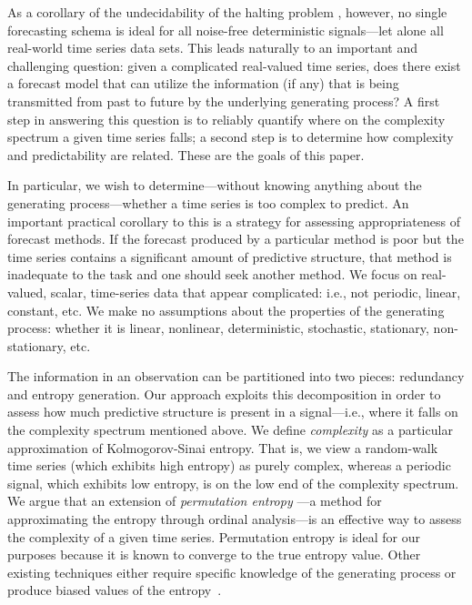 As a corollary of the undecidability of the halting problem
\cite{halting-problem}, however, no single forecasting schema is ideal
for all noise-free deterministic signals\cite{weigend-book}---let
alone all real-world time series data sets.  This leads naturally to
an important and challenging question: given a complicated real-valued
time series, does there exist a forecast model that can utilize the
information (if any) that is being transmitted from past to future by
the underlying generating process?  A first step in answering this
question is to reliably quantify where on the complexity spectrum a
given time series falls; a second step is to determine how complexity
and predictability are related.  These are the goals of this paper.

In particular, we wish to determine---without knowing anything about
the generating process---whether a time series is too complex to
predict.  An important practical corollary to this is a strategy for
assessing appropriateness of forecast methods.  If the forecast
produced by a particular method is poor but the time series contains a
significant amount of predictive structure, that method is inadequate
to the task and one should seek another method.  We focus on
real-valued, scalar, time-series data that appear complicated: i.e.,
not periodic, linear, constant, etc.  We make no assumptions about the
properties of the generating process: whether it is linear, nonlinear,
deterministic, stochastic, stationary, non-stationary, etc.  

The information in an observation can be partitioned into two pieces:
redundancy and entropy generation\cite{crutchfield2003}.  Our approach
exploits this decomposition in order to assess how much predictive
structure is present in a signal---i.e., where it falls on the
complexity spectrum mentioned above.  We define \emph{complexity} as a
particular approximation of Kolmogorov-Sinai entropy\cite{KS-entropy}.
That is, we view a random-walk time series (which exhibits high
entropy) as purely complex, whereas a periodic signal, which exhibits
low entropy, is on the low end of the complexity spectrum.  We argue
that an extension of \emph{permutation entropy}
\cite{bandt2002per}---a method for approximating the entropy through
ordinal analysis---is an effective way to assess the complexity of a
given time series.  Permutation entropy is ideal for our purposes
because it is known to converge to the true entropy value. Other
existing techniques either require specific knowledge of the
generating process or produce biased values of the
entropy~\cite{bollt2001}.


